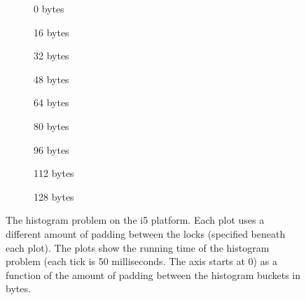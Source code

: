 \begin{figure}[hbpt]
	\graphicspath{{plots/}}
	\begin{subfigure}{0.32\textwidth}
		
		\caption{0 bytes}
	\end{subfigure}
	\begin{subfigure}{0.32\textwidth}
		
		\caption{16 bytes}
	\end{subfigure}
	\begin{subfigure}{0.32\textwidth}
		
		\caption{32 bytes}
	\end{subfigure}
	\begin{subfigure}{0.32\textwidth}
		
		\caption{48 bytes}
	\end{subfigure}
	\begin{subfigure}{0.32\textwidth}
		
		\caption{64 bytes}
	\end{subfigure}
	\begin{subfigure}{0.32\textwidth}
		
		\caption{80 bytes}
	\end{subfigure}
	\begin{subfigure}{0.32\textwidth}
		
		\caption{96 bytes}
	\end{subfigure}
	\begin{subfigure}{0.32\textwidth}
		
		\caption{112 bytes}
	\end{subfigure}
	\begin{subfigure}{0.32\textwidth}
		
		\caption{128 bytes}
	\end{subfigure}
	\caption{The histogram problem on the i5 platform. Each plot uses a
	different amount of padding between the locks (specified beneath each
	plot). The plots show the running time of the histogram problem (each
	tick is 50 milliseconds. The axis starts at 0) as a function of the amount of padding between
	the histogram buckets in bytes.}
\end{figure}

